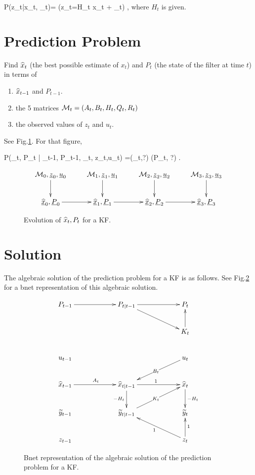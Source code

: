 \beq\color{blue}
P(z_t|x_t, \zeta_t)=
\indi(z_t=H_t x_t +  \zeta_t)
\;,
\eeq
where $H_t$ is given.


\section{Prediction
Problem}
Find ${\widehat{x}}_t$ (the 
best possible estimate
of $x_t$)
and $P_t$ (the state of the 
filter at time $t$)
in terms of 
\begin{enumerate}
\item
${\widehat{x}}_{t-1}$
and $P_{t-1}$.
\item
 the 5 matrices
${\cal M}_t=(A_t,B_t,H_t,Q_t,R_t)$
\item
the observed  values of 
$z_t$ and $u_t$.

\end{enumerate}
See Fig.\ref{fig-kal-evol}.
For that figure,

\beq \color{blue}
P(\hatx_t, P_t | 
\hatx_{t-1}, P_{t-1},
\calm_t,
z_t,u_t)
=\delta(\hatx_t,?)
\delta(P_t, ?)
\;.
\eeq

\begin{figure}[h!]
\centering
$$\xymatrix{
\calm_0, \rvz_0,\rvu_0\ar[d]&
\calm_1, \rvz_1,\rvu_1\ar[d]&
\calm_2, \rvz_2,\rvu_2\ar[d]&
\calm_3, \rvz_3,\rvu_3\ar[d]
\\
\ul{\hatx}_0, 
\ul{P}_0\ar[r]&
\ul{\hatx}_1, 
\ul{P}_1\ar[r]&
\ul{\hatx}_2, 
\ul{P}_2\ar[r]&
\ul{\hatx}_3, 
\ul{P}_3
}$$
\caption{Evolution of
${\widehat{x}}_t, P_t$ for a KF.}
\label{fig-kal-evol}
\end{figure}

\section{
Solution} 

The algebraic solution
of
the prediction problem
for a KF 
is as follows.
See Fig.\ref{fig-kal-evol-plus}
for a bnet representation
of this algebraic
solution.

\begin{figure}[h!]
$$
\xymatrix@C=5pc{
P_{t-1}\ar[r]
&P_{t|t-1}\ar[r]\ar[rd]
&P_t
\\
&&
K_t\ar[u]
\\
u_{t-1}
&
&u_t\ar[ld]|{B_t}
\\
\hatx_{t-1}\ar[r]^{A_t}
&\hatx_{t|t-1}\ar[r]^1
\ar[d]_{-H_t}
&\hatx_t\ar[d]^{-H_t}
\\
\TIL{y}_{t-1}
&\TIL{y}_{t|t-1}\ar[ru]|{K_t}
&\TIL{y}_t
\\
z_{t-1}
&
&z_t\ar[lu]^1
\ar[u]_1
}
$$
\caption{Bnet representation
of the algebraic
solution of
the prediction 
problem for a KF.}
\label{fig-kal-evol-plus}
\end{figure}


